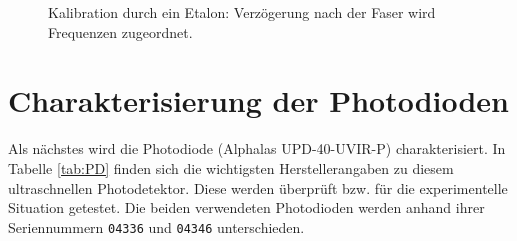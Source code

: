\documentclass[bachelor,       %
               twoside,        %
               BCOR10mm,       %
               liststotoc,nomtotoc,bibtotoc, %
               english,ngerman, %
               final,          %
               ]{GAUBM}
\begin{document}
\begin{figure}[!htb]
   \centering
   \hfill
   \hfill
   \caption{Kalibration durch ein Etalon: Verzögerung nach der Faser wird Frequenzen zugeordnet.}
   \label{fig:caliEtalon}
\end{figure}

\section{Charakterisierung der Photodioden}
Als nächstes wird die Photodiode (Alphalas UPD-40-UVIR-P) charakterisiert.
In Tabelle \ref{tab:PD} finden sich die wichtigsten Herstellerangaben zu diesem ultraschnellen Photodetektor.
Diese werden überprüft bzw. für die experimentelle Situation getestet.
Die beiden verwendeten Photodioden werden anhand ihrer Seriennummern \texttt{04336} und \texttt{04346} unterschieden.
\end{document}
